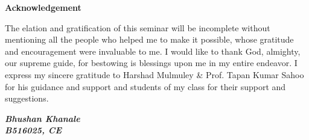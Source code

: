 \vspace{1in}
\centerline{\Large{\bf Acknowledgement}}
\vspace{.75cm}
\noindent
The elation and gratification of this seminar will be incomplete without
mentioning all the people who helped me to make it possible, whose gratitude
and encouragement were invaluable to me. I would like to thank God, almighty,
our supreme guide, for bestowing is blessings upon me in my entire endeavor.
I express my sincere gratitude to  Harshad Mulmuley \& Prof. Tapan Kumar Sahoo
for his guidance and support and students of my class for their support and
suggestions. 
\\
\begin{flushright}
{\textit{\textbf{Bhushan Khanale}}}\\
{\textit{\textbf{B516025, CE}}}\\
\end{flushright}
